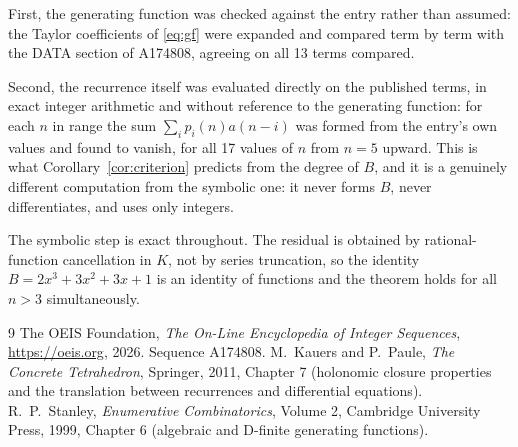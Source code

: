 \documentclass[11pt,a4paper]{article}
\theoremstyle{plain}
\theoremstyle{definition}
\begin{document}
First, the generating function was checked against the entry rather than assumed: the
Taylor coefficients of \eqref{eq:gf} were expanded and compared term by term with the DATA
section of A174808, agreeing on all 13 terms compared.

Second, the recurrence itself was evaluated directly on the published terms, in exact
integer arithmetic and without reference to the generating function: for each $n$ in range
the sum $\sum_{i}p_{i}(n)a(n-i)$ was formed from the entry's own values and found to
vanish, for all 17 values of $n$ from $n=5$ upward. This is what
Corollary~\ref{cor:criterion} predicts from the degree of $B$, and it is a genuinely
different computation from the symbolic one: it never forms $B$, never differentiates, and
uses only integers.

The symbolic step is exact throughout. The residual is obtained by rational-function
cancellation in $K$, not by series truncation, so the identity $B=2 x^{3} + 3 x^{2} + 3 x + 1$ is an
identity of functions and the theorem holds for all $n>3$ simultaneously.

\begin{thebibliography}{9}
 The OEIS Foundation, \emph{The On-Line Encyclopedia of Integer Sequences},
\url{https://oeis.org}, 2026. Sequence A174808.
 M.~Kauers and P.~Paule, \emph{The Concrete Tetrahedron}, Springer, 2011,
Chapter 7 (holonomic closure properties and the translation between recurrences and
differential equations).
 R.~P.~Stanley, \emph{Enumerative Combinatorics}, Volume 2, Cambridge
University Press, 1999, Chapter 6 (algebraic and D-finite generating functions).
\end{thebibliography}
\end{document}
